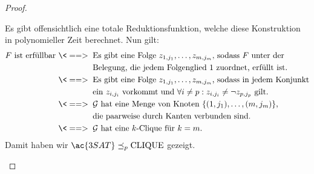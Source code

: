 \begin{proof}
\begin{itemize}
    Es gibt offensichtlich eine totale Reduktionsfunktion, welche diese Konstruktion in polynomieller Zeit berechnet.
    Nun gilt:
    \begin{align*}
    F \text{ ist erfüllbar } \<==> \;\; & \text{Es gibt eine Folge $z_{1,j_1},\dots,z_{m,j_m}$, sodass $F$ unter der}\\
    & \text{Belegung, die jedem Folgenglied $1$ zuordnet, erfüllt ist.}\\
    \<==> \;\;   & \text{Es gibt eine Folge $z_{1,j_1},\dots,z_{m,j_m}$, sodass in jedem Konjunkt}\\
    & \text{ein $z_{i,j_i}$ vorkommt und $\forall i\neq p: z_{i,j_i}\neq \neg z_{p,j_p}$ gilt.}\\
    \<==> \;\;   & \text{$\mathcal{G}$ hat eine Menge von Knoten $\{(1,j_1),\dots,(m,j_m)\}$,}\\
    & \text{die paarweise durch Kanten verbunden sind.}\\
    \<==> \;\;   & \text{$\mathcal{G}$ hat eine $k$-Clique für $k=m$.}
    \end{align*}
    Damit haben wir $\ac{3SAT} \preceq_p \CLIQUE$ gezeigt.
    \qedhere
    \end{itemize}
\end{proof}



